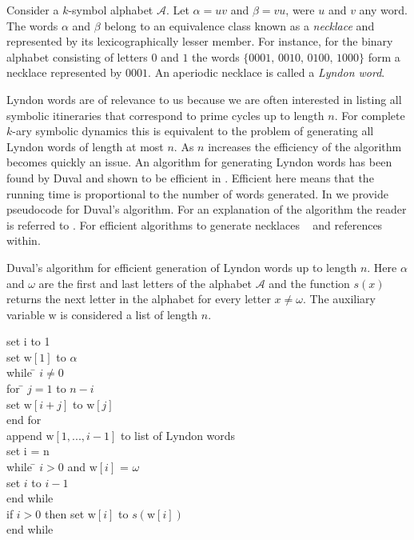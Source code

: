 \renewcommand{\inputfile}{\version\ - edited 2008-06-26 lyndon}

Consider a $k$-symbol alphabet $\mathcal{A}$. Let
$\alpha=uv$ and $\beta=vu$, were $u$ and $v$ any word. The words $\alpha$
and $\beta$ belong to an equivalence class known as a \emph{necklace} and
represented by its
lexicographically lesser member.
For instance, for the binary alphabet consisting of letters $0$ and $1$
the words $\{0001,\, 0010,\, 0100,\, 1000\}$ form a necklace
represented by $0001$. An aperiodic necklace is called a \emph{Lyndon word}.

Lyndon words are of relevance to us because we are often interested
in listing all symbolic itineraries that correspond to prime cycles up to
length $n$. For complete $k$-ary symbolic dynamics this is equivalent to the problem
of generating all Lyndon words of length at most $n$. As $n$ increases the efficiency
of the algorithm becomes quickly an issue. An algorithm for generating Lyndon
words has been found by Duval
and shown to be efficient in .
Efficient here means that the running time is proportional to the number of words generated.
In  we provide pseudocode for Duval's
algorithm. For an explanation of the algorithm the reader is referred to
. For efficient algorithms to generate necklaces \cf~
and references within.

\begin{table} \label{tab:duval}
\caption[Duval's algorithm for generation of Lyndon words]
        {
Duval's algorithm for efficient generation of Lyndon words up to length $n$.
Here $\alpha$
and $\omega$ are the first and last letters of the alphabet $\mathcal{A}$ and the function $s(x)$
returns the next letter in the alphabet for every letter $x \neq \omega$.
The auxiliary variable $\mathrm{w}$ is considered
a list of length $n$.}
\begin{tabbing}
   set i to 1 \\
   set $\mathrm{w}[1]$ to $\alpha$ \\
   while \= $i \neq 0$ \\
    	 \>  for \= $j=1$ to $n-i$ \\
         \>	\>  set $\mathrm{w}[i+j]$ to $\mathrm{w}[j]$ \\
	 \>  end for  \\
         \>  append $\mathrm{w}[1,...,i-1]$ to list of Lyndon words \\
         \>  set i = n \\
         \>  while \=  $i > 0$ and $\mathrm{w}[i]$ = $\omega$ \\
         \>       \> set $i$ to $i - 1$ \\
     	 \>  end while	\\	
         \>  if $i > 0$ then set $\mathrm{w}[i]$ to $s(\mathrm{w}[i])$ \\
   end while
\end{tabbing}
\end{table}


